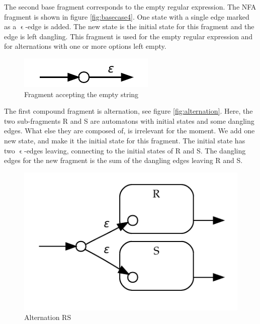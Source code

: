 The second base fragment corresponds to the empty regular
expression. The NFA fragment is shown in figure
\vref{fig:basecase4}. One state with a single edge marked as a
$\upvarepsilon$-edge is added. The new state is the initial state for
this fragment and the edge is left dangling. This fragment is used for
the empty regular expression and for alternations with one or more
options left empty.





\begin{figure}
  \centering
  \includegraphics{parsing/basecase4}
  \caption{Fragment accepting the empty string}
  \label{fig:basecase4}
\end{figure}



The first compound fragment is alternation, see figure
\vref{fig:alternation}. Here, the two sub-fragments R and S are
automatons with initial states and some dangling edges. What else they
are composed of, is irrelevant for the moment. We add one new state,
and make it the initial state for this fragment. The initial state has
two $\upvarepsilon$-edges leaving, connecting to the initial states of
R and S. The dangling edges for the new fragment is the sum of the
dangling edges leaving R and S.

\begin{figure}
  \centering
  \includegraphics{parsing/alternation}
  \caption{Alternation R\textbar S}
  \label{fig:alternation}
\end{figure}

